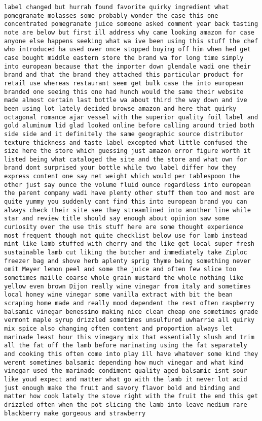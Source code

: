 \documentclass[11pt]{article}
\begin{document}
\begin{Verbatim}[commandchars=\\\{\}]
label changed but hurrah found favorite quirky ingredient what pomegranate molasses some probably wonder the case this one concentrated pomegranate juice someone asked comment year back tasting note are below but first ill address why came looking amazon for case anyone else happens seeking what wa ive been using this stuff the chef who introduced ha used over once stopped buying off him when hed get case bought middle eastern store the brand wa for long time simply into european because that the importer down glendale wadi one their brand and that the brand they attached this particular product for retail use whereas restaurant seem get bulk case the into european branded one seeing this one had hunch would the same their website made almost certain last bottle wa about third the way down and ive been using lot lately decided browse amazon and here that quirky octagonal romance ajar vessel with the superior quality foil label and gold aluminum lid glad looked online before calling around tried both side side and it definitely the same geographic source distributor texture thickness and taste label excepted what little confused the size here the store which guessing just amazon error figure worth it listed being what cataloged the site and the store and what own for brand dont surprised your bottle while two label differ how they express content one say net weight which would per tablespoon the other just say ounce the volume fluid ounce regardless into european the parent company wadi have plenty other stuff them too and most are quite yummy you suddenly cant find this into european brand you can always check their site see they streamlined into another line while star and review title should say enough about opinion saw some curiosity over the use this stuff here are some thought experience most frequent though not quite checklist below use for lamb instead mint like lamb stuffed with cherry and the like get local super fresh sustainable lamb cut liking the butcher and immediately take Ziploc freezer bag and shove herb aplenty sprig thyme being something never omit Meyer lemon peel and some the juice and often few slice too sometimes maille coarse whole grain mustard the whole nothing like yellow even brown Dijon really wine vinegar from italy and sometimes local honey wine vinegar some vanilla extract with bit the bean scraping home made and really mood dependent the rest often raspberry balsamic vinegar benessimo making nice clean cheap one sometimes grade vermont maple syrup drizzled sometimes unsulfured uwharrie all quirky mix spice also changing often content and proportion always let marinade least hour this vinegary mix that essentially slush and trim all the fat off the lamb before marinating using the fat separately and cooking this often come into play ill have whatever some kind they werent sometimes balsamic depending how much vinegar and what kind vinegar used the marinade condiment quality aged balsamic isnt sour like youd expect and matter what go with the lamb it never lot acid just enough make the fruit and savory flavor bold and binding and matter how cook lately the stove right with the fruit the end this get drizzled often when the pot slicing the lamb into leave medium rare blackberry make gorgeous and strawberry 
\end{Verbatim}
\end{document}
